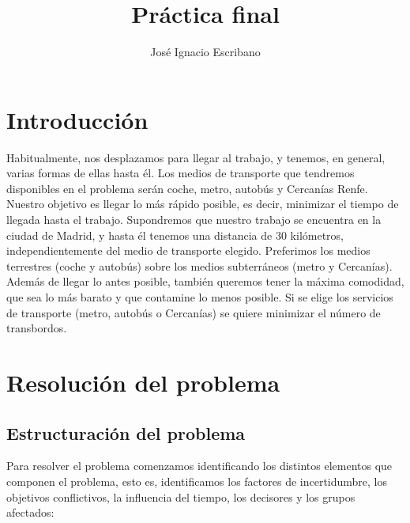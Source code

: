 \documentclass[12pt,a4paper,twoside,openright,titlepage,final]{article}
\author{José Ignacio Escribano}
\title{Práctica final}
\begin{document}
\setcounter{page}{1}


\listoffigures
\thispagestyle{empty}
\newpage

\listoftables
\thispagestyle{empty}
\newpage

\tableofcontents
\thispagestyle{empty}
\newpage


\setcounter{page}{1}

\section{Introducción}

Habitualmente, nos desplazamos para llegar al trabajo, y tenemos, en general, varias formas de ellas hasta él. Los medios de transporte que tendremos disponibles en el problema serán coche, metro, autobús y Cercanías Renfe. Nuestro objetivo es llegar lo más rápido posible, es decir, minimizar el tiempo de llegada hasta el trabajo. Supondremos que nuestro trabajo se encuentra en la ciudad de Madrid, y hasta él tenemos una distancia de 30 kilómetros, independientemente del medio de transporte elegido. Preferimos los medios terrestres (coche y autobús) sobre los medios subterráneos (metro y Cercanías). Además de llegar lo antes posible, también queremos tener la máxima comodidad, que sea lo más barato y que contamine lo menos posible. Si se elige los servicios de transporte (metro, autobús o Cercanías) se quiere minimizar el número de transbordos.\\

\section{Resolución del problema}

\subsection{Estructuración del problema}

Para resolver el problema comenzamos identificando los distintos elementos que componen el problema, esto es, identificamos los factores de incertidumbre, los objetivos conflictivos, la influencia del tiempo, los decisores y los grupos afectados:\\
\end{document}
